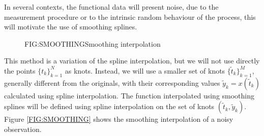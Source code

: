 In several contexts, the functional data will present noise, due to the
measurement procedure or to the intrinsic random behaviour of the process,
this will motivate the use of smoothing splines.

\begin{figure}[Example of smoothing]{FIG:SMOOTHING}{Smoothing interpolation}
	 \quad
\end{figure}

This method is a variation of the spline interpolation, but we will not
use directly the points $\{t_k\}_{k=1}^{N}$ as knots. Instead, we will use a
smaller set of knots $\{\tilde t_k\}_{k=1}^{M}$, generally different from the
originals, with their corresponding values $\tilde y_k = x(\tilde t_k)$
calculated using spline interpolation. The function interpolated using smoothing
splines will be defined using spline interpolation on the set of knots
$(\tilde t_k, \tilde y_k)$. Figure \ref{FIG:SMOOTHING} shows the smoothing
interpolation of a noisy observation.


